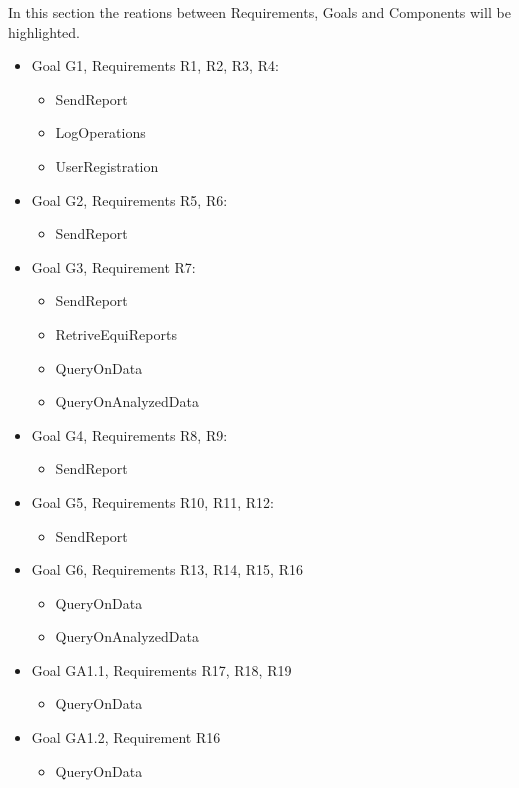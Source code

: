 In this section the reations between Requirements, Goals and Components will be highlighted.\\

\begin{itemize}
	\item Goal G1, Requirements R1, R2, R3, R4:
	\begin{itemize}
		\item SendReport 
		\item LogOperations
		\item UserRegistration
	\end{itemize}
	\item Goal G2, Requirements R5, R6:
	\begin{itemize}
		\item SendReport
	\end{itemize}
	\item Goal G3, Requirement R7:
	\begin{itemize}
		\item SendReport
		\item RetriveEquiReports
		\item QueryOnData
		\item QueryOnAnalyzedData
	\end{itemize}
	\item Goal G4, Requirements R8, R9:
	\begin{itemize}
		\item SendReport
	\end{itemize}
	\item Goal G5, Requirements R10, R11, R12:
	\begin{itemize}
		\item SendReport
	\end{itemize}
	\item Goal G6, Requirements R13, R14, R15, R16
	\begin{itemize}
		\item QueryOnData
		\item QueryOnAnalyzedData
	\end{itemize}
	\item Goal GA1.1, Requirements R17, R18, R19
	\begin{itemize}
		\item QueryOnData
	\end{itemize}
	\item Goal GA1.2, Requirement R16
	\begin{itemize}
		\item QueryOnData
	\end{itemize}

\end{itemize}

